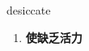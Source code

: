 
\begin{frame}
{\huge desiccate}
\begin{center}
\begin{enumerate}\Large
  \item \textbf{使缺乏活力}
\end{enumerate}
\end{center}
\end{frame}
